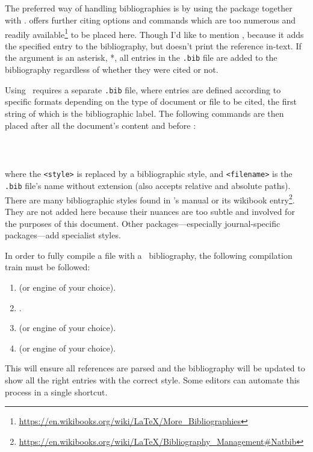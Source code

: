 \subsection{\BibTeX}\label{sb:bib}
%
The preferred way of handling bibliographies is by using the
 package together with \BibTeX.   offers
further citing options and commands which are too numerous and readily
available\footnote{\url{https://en.wikibooks.org/wiki/LaTeX/More_Bibliographies}}
to be placed here.  Though I'd like to mention ,
because it adds the specified entry to the bibliography, but doesn't
print the reference in-text.  If the argument is an asterisk, *, all
entries in the \verb|.bib| file are added to the bibliography
regardless of whether they were cited or not.

Using \BibTeX~requires a separate \verb|.bib| file, where entries are
defined according to specific formats depending on the type of
document or file to be cited, the first string of which is the
bibliographic label.  The following commands are then placed after all
the document's content and before :
\begin{verbatim}
    
    
\end{verbatim}
where the \verb|<style>| is replaced by a bibliographic style, and
\verb|<filename>| is the \verb|.bib| file's name without extension
(also accepts relative and absolute paths).  There are many
bibliographic styles found in 's manual or its wikibook
entry\footnote{\url{https://en.wikibooks.org/wiki/LaTeX/Bibliography_Management\#Natbib}}.
They are not added here because their nuances are too subtle and
involved for the purposes of this document.  Other
packages---especially journal-specific packages---add specialist
styles.

In order to fully compile a file with a \BibTeX~bibliography, the
following compilation train must be followed:
\begin{enumerate}
    \item \XeLaTeX (or engine of your choice).
    \item \BibTeX.
    \item \XeLaTeX (or engine of your choice).
    \item \XeLaTeX (or engine of your choice).
\end{enumerate}
This will ensure all references are parsed and the bibliography will
be updated to show all the right entries with the correct style.  Some
editors can automate this process in a single shortcut.
%
